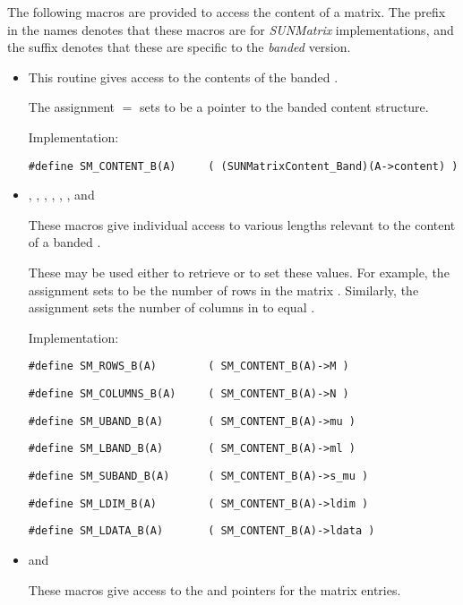 The following macros are provided to access the
content of a {\sunmatband} matrix. The prefix  in the names
denotes that these macros are for \emph{SUNMatrix} implementations,
and the suffix  denotes that these are specific to
the \emph{banded} version.
\begin{itemize}

\item {}

  This routine gives access to the contents of the
  banded .

  The assignment  $=$  sets
   to be a pointer to the banded  content
  structure.

  Implementation:

  \verb|#define SM_CONTENT_B(A)     ( (SUNMatrixContent_Band)(A->content) )|

\item {}, , , , , , and 

  These macros give individual access to various lengths relevant to the
  content of a banded .

  These may be used either to retrieve or to set these values.  For
  example, the assignment  sets  to be
  the number of rows in the matrix .  Similarly, the
  assignment  sets the number of
  columns in  to equal .

  Implementation:

  \verb|#define SM_ROWS_B(A)        ( SM_CONTENT_B(A)->M )|

  \verb|#define SM_COLUMNS_B(A)     ( SM_CONTENT_B(A)->N )|

  \verb|#define SM_UBAND_B(A)       ( SM_CONTENT_B(A)->mu )|

  \verb|#define SM_LBAND_B(A)       ( SM_CONTENT_B(A)->ml )|

  \verb|#define SM_SUBAND_B(A)      ( SM_CONTENT_B(A)->s_mu )|

  \verb|#define SM_LDIM_B(A)        ( SM_CONTENT_B(A)->ldim )|

  \verb|#define SM_LDATA_B(A)       ( SM_CONTENT_B(A)->ldata )|

\item {} and 

  These macros give access to the  and  pointers for
  the matrix entries.


\end{itemize}
